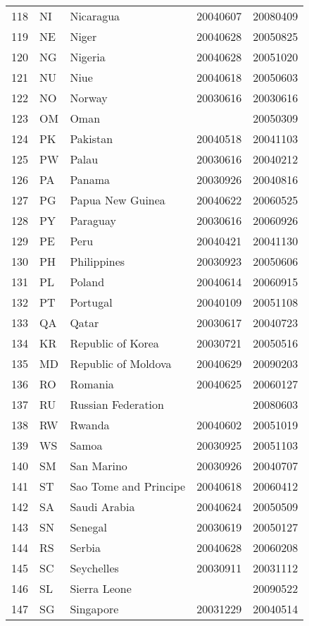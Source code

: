 \begin{longtable}{rllrr}
  118 & NI & Nicaragua & 20040607 & 20080409 \\ 
  119 & NE & Niger & 20040628 & 20050825 \\ 
  120 & NG & Nigeria & 20040628 & 20051020 \\ 
  121 & NU & Niue & 20040618 & 20050603 \\ 
  122 & NO & Norway & 20030616 & 20030616 \\ 
  123 & OM & Oman &  & 20050309 \\ 
  124 & PK & Pakistan & 20040518 & 20041103 \\ 
  125 & PW & Palau & 20030616 & 20040212 \\ 
  126 & PA & Panama & 20030926 & 20040816 \\ 
  127 & PG & Papua New Guinea & 20040622 & 20060525 \\ 
  128 & PY & Paraguay & 20030616 & 20060926 \\ 
  129 & PE & Peru & 20040421 & 20041130 \\ 
  130 & PH & Philippines & 20030923 & 20050606 \\ 
  131 & PL & Poland & 20040614 & 20060915 \\ 
  132 & PT & Portugal & 20040109 & 20051108 \\ 
  133 & QA & Qatar & 20030617 & 20040723 \\ 
  134 & KR & Republic of Korea & 20030721 & 20050516 \\ 
  135 & MD & Republic of Moldova & 20040629 & 20090203 \\ 
  136 & RO & Romania & 20040625 & 20060127 \\ 
  137 & RU & Russian Federation &  & 20080603 \\ 
  138 & RW & Rwanda & 20040602 & 20051019 \\ 
  139 & WS & Samoa & 20030925 & 20051103 \\ 
  140 & SM & San Marino & 20030926 & 20040707 \\ 
  141 & ST & Sao Tome and Principe & 20040618 & 20060412 \\ 
  142 & SA & Saudi Arabia & 20040624 & 20050509 \\ 
  143 & SN & Senegal & 20030619 & 20050127 \\ 
  144 & RS & Serbia & 20040628 & 20060208 \\ 
  145 & SC & Seychelles & 20030911 & 20031112 \\ 
  146 & SL & Sierra Leone &  & 20090522 \\ 
  147 & SG & Singapore & 20031229 & 20040514 \\ 

\end{longtable}
